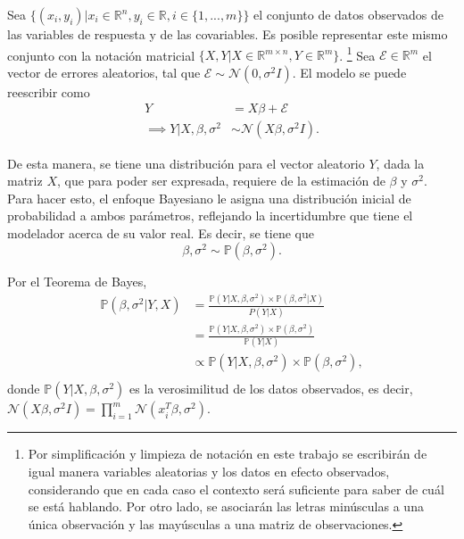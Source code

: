 Sea $\{(x_i,y_i)| x_i \in \mathbb{R}^n, y_i \in \mathbb{R}, i \in \{1,...,m\} \}$ el conjunto de datos observados de las variables de respuesta y de las covariables. Es posible representar este mismo conjunto con la notaci\'on matricial $\{X,Y | X \in \mathbb{R}^{m \times n}, Y \in \mathbb{R}^m\}$. \footnote{Por simplificaci\'on y limpieza de notaci\'on en este trabajo se escribir\'an de igual manera variables aleatorias y los datos en efecto observados, considerando que en cada caso el contexto ser\'a suficiente para saber de cu\'al se est\'a hablando. Por otro lado, se asociar\'an las letras min\'usculas a una \'unica observaci\'on y las may\'usculas a una matriz de observaciones.} Sea $\mathcal{E} \in \mathbb{R}^m$ el vector de errores aleatorios, tal que $\mathcal{E} \sim \mathcal{N}(0,\sigma^2 I)$. El modelo se puede reescribir como
\begin{equation*}
\begin{aligned}
    Y &= X\beta + \mathcal{E} \\
    \implies Y|X,\beta,\sigma^2 &\sim \mathcal{N}(X\beta,\sigma^2 I).
\end{aligned}
\end{equation*}

De esta manera, se tiene una distribuci\'on para el vector aleatorio $Y$, dada la matriz $X$, que para poder ser expresada, requiere de la estimaci\'on de $\beta$ y $\sigma^2$. Para hacer esto, el enfoque Bayesiano le asigna una distribución inicial de probabilidad a ambos par\'ametros, reflejando la incertidumbre que tiene el modelador acerca de su valor real. Es decir, se tiene que 
\begin{equation*}
    \beta,\sigma^2 \sim \mathbb{P}(\beta,\sigma^2).
\end{equation*}

Por el Teorema de Bayes,
\begin{equation*}
\begin{aligned}
    \mathbb{P}(\beta,\sigma^2 | Y, X) 
    &= \frac{\mathbb{P}(Y| X, \beta, \sigma^2) \times \mathbb{P}(\beta, \sigma^2 | X)}{P(Y | X)} \\
    &= \frac{\mathbb{P}(Y| X, \beta, \sigma^2) \times \mathbb{P}(\beta, \sigma^2)}{\mathbb{P}(Y | X)} \\
    &\propto \mathbb{P}(Y| X, \beta, \sigma^2) \times \mathbb{P}(\beta, \sigma^2), \\
\end{aligned}
\end{equation*}
donde $\mathbb{P}(Y| X, \beta, \sigma^2)$ es la verosimilitud de los datos observados, es decir, $ \mathcal{N}(X\beta,\sigma^2 I) = \prod_{i=1}^m \mathcal{N}(x_i^T\beta,\sigma^2)$. 

